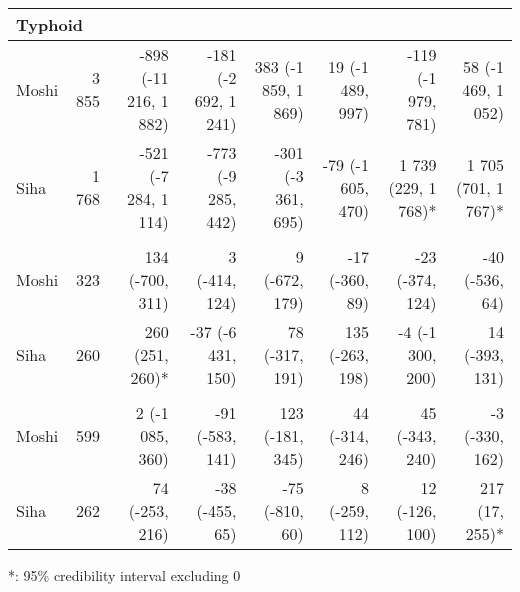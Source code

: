 \begin{table}[t]
\begin{tabular*}{\linewidth}{@{\extracolsep{\fill}}l|rrrrrrr}
\multicolumn{8}{l}{Typhoid} \\[2.5pt] 
\midrule\addlinespace[2.5pt]
Moshi & 3 855 & -898 (-11 216, 1 882)  & -181 (-2 692, 1 241)  & 383 (-1 859, 1 869)  & 19 (-1 489, 997)  & -119 (-1 979, 781)  & 58 (-1 469, 1 052)  \\ 
Siha & 1 768 & -521 (-7 284, 1 114)  & -773 (-9 285, 442)  & -301 (-3 361, 695)  & -79 (-1 605, 470)  & 1 739 (229, 1 768)* & 1 705 (701, 1 767)* \\ 
\midrule\addlinespace[2.5pt]
\multicolumn{8}{l}{Leprosy} \\[2.5pt] 
\midrule\addlinespace[2.5pt]
Moshi & 323 & 134 (-700, 311)  & 3 (-414, 124)  & 9 (-672, 179)  & -17 (-360, 89)  & -23 (-374, 124)  & -40 (-536, 64)  \\ 
Siha & 260 & 260 (251, 260)* & -37 (-6 431, 150)  & 78 (-317, 191)  & 135 (-263, 198)  & -4 (-1 300, 200)  & 14 (-393, 131)  \\ 
\midrule\addlinespace[2.5pt]
\multicolumn{8}{l}{Schistosomiasis} \\[2.5pt] 
\midrule\addlinespace[2.5pt]
Moshi & 599 & 2 (-1 085, 360)  & -91 (-583, 141)  & 123 (-181, 345)  & 44 (-314, 246)  & 45 (-343, 240)  & -3 (-330, 162)  \\ 
Siha & 262 & 74 (-253, 216)  & -38 (-455, 65)  & -75 (-810, 60)  & 8 (-259, 112)  & 12 (-126, 100)  & 217 (17, 255)* \\ 
\bottomrule
\end{tabular*}
\begin{minipage}{\linewidth}
*: 95\% credibility interval excluding 0\\
\end{minipage}
\end{table}

